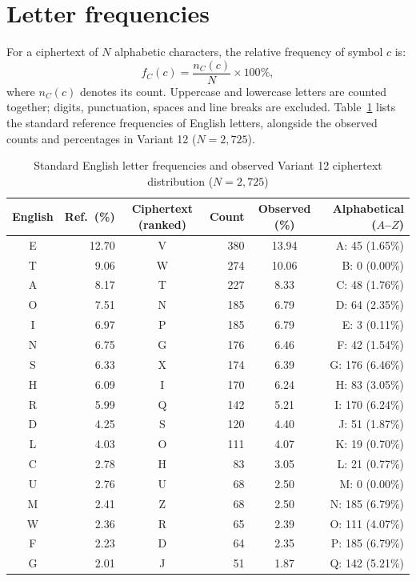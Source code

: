 \documentclass{utmreport}
\begin{document}
\section{Letter frequencies}
For a ciphertext of $N$ alphabetic characters, the relative frequency of symbol $c$ is:
\begin{equation}
f_C(c)=\frac{n_C(c)}{N}\times100\%,
\end{equation}
where $n_C(c)$ denotes its count. Uppercase and lowercase letters are counted together; digits, punctuation, spaces and line breaks are excluded. Table~\ref{tab:english} lists the standard reference frequencies of English letters, alongside the observed counts and percentages in Variant 12 ($N=2{,}725$).
\clearpage
\begin{table}[!htbp]
\caption{Standard English letter frequencies and observed Variant 12 ciphertext distribution ($N=2{,}725$)}
\label{tab:english}\centering
\begin{tabular}{crcrcr}\hline
English & Ref.\ (\%) & Ciphertext (ranked) & Count & Observed (\%) & Alphabetical ($A$--$Z$)\\\hline
E & 12.70 & V & 380 & 13.94 & A: 45 (1.65\%)\\
T &  9.06 & W & 274 & 10.06 & B: 0 (0.00\%)\\
A &  8.17 & T & 227 &  8.33 & C: 48 (1.76\%)\\
O &  7.51 & N & 185 &  6.79 & D: 64 (2.35\%)\\
I &  6.97 & P & 185 &  6.79 & E: 3 (0.11\%)\\
N &  6.75 & G & 176 &  6.46 & F: 42 (1.54\%)\\
S &  6.33 & X & 174 &  6.39 & G: 176 (6.46\%)\\
H &  6.09 & I & 170 &  6.24 & H: 83 (3.05\%)\\
R &  5.99 & Q & 142 &  5.21 & I: 170 (6.24\%)\\
D &  4.25 & S & 120 &  4.40 & J: 51 (1.87\%)\\
L &  4.03 & O & 111 &  4.07 & K: 19 (0.70\%)\\
C &  2.78 & H &  83 &  3.05 & L: 21 (0.77\%)\\
U &  2.76 & U &  68 &  2.50 & M: 0 (0.00\%)\\
M &  2.41 & Z &  68 &  2.50 & N: 185 (6.79\%)\\
W &  2.36 & R &  65 &  2.39 & O: 111 (4.07\%)\\
F &  2.23 & D &  64 &  2.35 & P: 185 (6.79\%)\\
G &  2.01 & J &  51 &  1.87 & Q: 142 (5.21\%)\\

\end{tabular}
\end{table}
\end{document}
